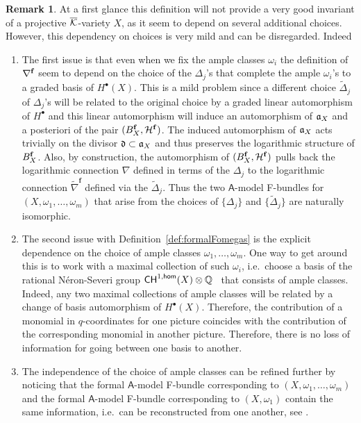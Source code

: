 \documentclass[twoside,leqno]{article}
\numberwithin{equation}{section}
\theoremstyle{plain}
\theoremstyle{definition}
\newtheorem{remark}[equation]{Remark}
\begin{document}
\begin{remark} \label{rem:ambiguities}
At a first glance this definition will not provide a very good invariant of a  projective $\overline{\mathcal K}$-variety $X$,  as it seem to depend on several additional choices. However, this dependency on choices is very mild and can be disregarded. Indeed
\begin{enumerate}[wide]
\item[(a)] The first issue is that even when we fix the ample classes $\omega_{i}$  the definition of $\nabla^{\mathbf{f}}$ seem to depend on the choice of the $\Delta_{j}$'s that complete the ample $\omega_{i}$'s to a graded basis of $H^{\bullet}(X)$.  This is a mild problem since a different choice $\widetilde{\Delta}_{j}$ of $\Delta_{j}$'s will be related to the original choice by a graded linear automorphism of $H^{\bullet}$ and this linear automorphism will induce an automorphism of ${\mathfrak{a}}_{X}$ and a posteriori of the pair $(B_{X}^{\mathbf{f}},\mathcal H^{\mathbf{f}})$. The induced  automorphism of ${\mathfrak{a}}_{X}$ acts trivially on the divisor $\mathfrak{d} \subset {\mathfrak{a}}_{X}$ and thus preserves the logarithmic structure of $B_{X}^{\mathbf{f}}$. Also, by construction, the automorphism of $(B_{X}^{\mathbf{f}},\mathcal H^{\mathbf{f}})$  pulls back the logarithmic connection $\nabla$ defined in terms of the $\Delta_{j}$ to the logarithmic connection $\widetilde{\nabla}^{\mathbf{f}}$ defined via the  $\widetilde{\Delta}_{j}$. Thus the two $\mathsf{A}$-model F-bundles for 
$(X,\omega_{1}, \ldots, \omega_{m})$ that arise from the choices of $\{\Delta_{j}\}$ and 
$\{\widetilde{\Delta}_{j}\}$ are naturally isomorphic. 
\item[(b)] The second issue with Definition~\ref{def:formalFomegas} is the explicit dependence on the choice of ample classes 
$\omega_{1}, \ldots, \omega_{m}$. One way to get around this is to work with a maximal collection of such $\omega_{i}$, i.e.\ choose a basis of the rational N\'{e}ron-Severi group $\mathsf{CH}^{1,\mathsf{hom}}(X)\otimes \mathbb Q$ \ that consists of ample classes. Indeed, any two  maximal collections of ample classes will be related by a change of basis automorphism of $H^{\bullet}(X)$. Therefore, the contribution of a monomial in $q$-coordinates for one picture coincides with the contribution of the corresponding monomial in another picture. Therefore, there is no loss of information for going between one basis to another.  %
\item[(c)] The independence of the choice of ample  classes can be refined further by noticing that 
the formal $\mathsf{A}$-model F-bundle corresponding to $(X,\omega_{1},\ldots,\omega_{m})$ and the formal $\mathsf{A}$-model F-bundle corresponding to $(X,\omega_{1})$ contain the same information, i.e.\ can be reconstructed from one another, see \cite[Lemma~2.24]{HYZZ_Decomposition}.

\end{enumerate}
\end{remark}
\end{document}
